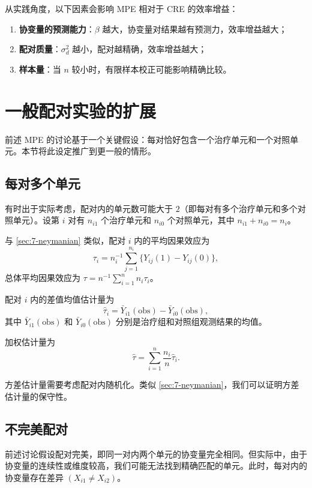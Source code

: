 从实践角度，以下因素会影响 MPE 相对于 CRE 的效率增益：
\begin{enumerate}
  \item \textbf{协变量的预测能力}：$\beta$ 越大，协变量对结果越有预测力，效率增益越大；
  \item \textbf{配对质量}：$\sigma_d^2$ 越小，配对越精确，效率增益越大；
  \item \textbf{样本量}：当 $n$ 较小时，有限样本校正可能影响精确比较。
\end{enumerate}

\section{一般配对实验的扩展}\label{sec:7-general-matched}

前述 MPE 的讨论基于一个关键假设：每对恰好包含一个治疗单元和一个对照单元。本节将此设定推广到更一般的情形。

\subsection{每对多个单元}\label{sec:7-general-multi}

有时出于实际考虑，配对内的单元数可能大于 $2$（即每对有多个治疗单元和多个对照单元）。设第 $i$ 对有 $n_{i1}$ 个治疗单元和 $n_{i0}$ 个对照单元，其中 $n_{i1} + n_{i0} = n_i$。

与 \cref{sec:7-neymanian} 类似，配对 $i$ 内的平均因果效应为
\[
\tau_i = n_i^{-1} \sum_{j=1}^{n_i} \{Y_{ij}(1) - Y_{ij}(0)\},
\]
总体平均因果效应为 $\tau = n^{-1}\sum_{i=1}^n n_i \tau_i$。

配对 $i$ 内的差值均值估计量为
\[
\hat\tau_i = \bar{Y}_{i1}(\text{obs}) - \bar{Y}_{i0}(\text{obs}),
\]
其中 $\bar{Y}_{i1}(\text{obs})$ 和 $\bar{Y}_{i0}(\text{obs})$ 分别是治疗组和对照组观测结果的均值。

加权估计量为
\[
\hat\tau = \sum_{i=1}^n \frac{n_i}{n} \hat\tau_i.
\]

方差估计量需要考虑配对内随机化。类似 \cref{sec:7-neymanian}，我们可以证明方差估计量的保守性。

\subsection{不完美配对}\label{sec:7-imperfect-pairing}

前述讨论假设配对完美，即同一对内两个单元的协变量完全相同。但实际中，由于协变量的连续性或维度较高，我们可能无法找到精确匹配的单元。此时，每对内的协变量存在差异 $(X_{i1} \neq X_{i2})$。

